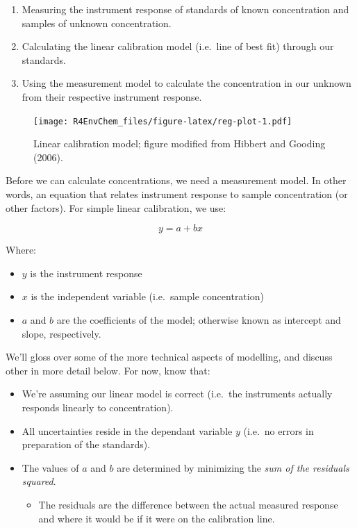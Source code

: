 \documentclass[
]{book}
\providecommand{\tightlist}{%
  \setlength{\itemsep}{0pt}\setlength{\parskip}{0pt}}
\begin{document}
\begin{enumerate}
\def\labelenumi{\arabic{enumi}.}
\tightlist
\item
  Measuring the instrument response of standards of known concentration and samples of unknown concentration.
\item
  Calculating the linear calibration model (i.e.~line of best fit) through our standards.
\item
  Using the measurement model to calculate the concentration in our unknown from their respective instrument response.
\end{enumerate}

\begin{figure}
\centering
\texttt{[image: R4EnvChem\_files/figure-latex/reg-plot-1.pdf]}
\caption{\label{fig:reg-plot}Linear calibration model; figure modified from Hibbert and Gooding (2006).}
\end{figure}

Before we can calculate concentrations, we need a measurement model. In other words, an equation that relates instrument response to sample concentration (or other factors). For simple linear calibration, we use:

\[ y = a + bx\]

Where:

\begin{itemize}
\tightlist
\item
  \(y\) is the instrument response
\item
  \(x\) is the independent variable (i.e.~sample concentration)
\item
  \(a\) and \(b\) are the coefficients of the model; otherwise known as intercept and slope, respectively.
\end{itemize}

We'll gloss over some of the more technical aspects of modelling, and discuss other in more detail below. For now, know that:

\begin{itemize}
\tightlist
\item
  We're assuming our linear model is correct (i.e.~the instruments actually responds linearly to concentration).
\item
  All uncertainties reside in the dependant variable \(y\) (i.e.~no errors in preparation of the standards).
\item
  The values of \(a\) and \(b\) are determined by minimizing the \emph{sum of the residuals squared}.

  \begin{itemize}
  \tightlist
  \item
    The residuals are the difference between the actual measured response and where it would be if it were on the calibration line.
  \end{itemize}
\end{itemize}
\end{document}
